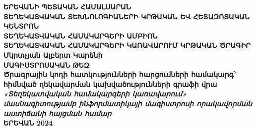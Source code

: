 \begin{titlepage}
    \begin{center}
        \linespread{1.3}
        \vspace{0.5cm}
        {
            \fontsize{18}{0}
            \textbf{ԵՐԵՎԱՆԻ ՊԵՏԱԿԱՆ ՀԱՄԱԼՍԱՐԱՆ} \\
        }
        \vspace{1cm}
        {
            \fontsize{18}{0}
            \textbf{ՏԵՂԵԿԱՏՎԱԿԱՆ ՏԵԽՆՈԼՈԳԻԱՆԵՐԻ ԿՐԹԱԿԱՆ ԵՎ ՀԵՏԱԶՈՏԱԿԱՆ ԿԵՆՏՐՈՆ} \\
        }
        \vspace{1cm}
        {
            \fontsize{16}{0}
            \textbf{ՏԵՂԵԿԱՏՎԱԿԱՆ ՀԱՄԱԿԱՐԳԵՐԻ ԱՄԲԻՈՆ} \\
        }
        \vspace{1cm}
        {
            \fontsize{18}{0}
            \textbf{ՏԵՂԵԿԱՏՎԱԿԱՆ ՀԱՄԱԿԱՐԳԵՐԻ ԿԱՌԱՎԱՐՈՒՄ ԿՐԹԱԿԱՆ ԾՐԱԳԻՐ} \\
        }
        \vspace{2cm}
        {
            \fontsize{18}{0}
            \textbf{Մկրտչյան Ալբերտ Կարենի} \\
        }
        \vspace{1.5cm}
        {
            \fontsize{18}{0}
            \textbf{ՄԱԳԻՍՏՐՈՍԱԿԱՆ ԹԵԶ} \\
        }
        \vspace{1cm}
        {
            \fontsize{16}{0}
            \textbf{Ծրագրային կոդի հատկությունների հարցումների համակարգ՝ հիմնված ղեկավարման կախվածությունների գրաֆի վրա} \\
        }
        \vfill
        {
            \fontsize{14}{0}
            \textbf{\textit{«Տեղեկատվական համակարգերի կառավարում» մասնագիտությամբ ինֆորմատիկայի մագիստրոսի որակավորման աստիճանի հայցման համար}} \\
        }
        \vspace{1cm}
        {
            \fontsize{13}{0}
            \textbf{ԵՐԵՎԱՆ 2024} \\
        }
    \end{center}
\end{titlepage}